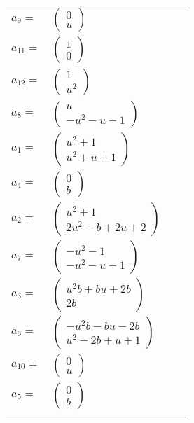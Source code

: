 \documentclass[1p]{elsarticle_modified}
\theoremstyle{definition}
\begin{document}
\begin{tabular}{m{7pt} m{180pt} m{7pt} m{180pt} }
\flushright $a_{9}=$&$\begin{pmatrix}0\\u\end{pmatrix}$ \\
\flushright $a_{11}=$&$\begin{pmatrix}1\\0\end{pmatrix}$ \\
\flushright $a_{12}=$&$\begin{pmatrix}1\\u^2\end{pmatrix}$ \\
\flushright $a_{8}=$&$\begin{pmatrix}u\\- u^2- u-1\end{pmatrix}$ \\
\flushright $a_{1}=$&$\begin{pmatrix}u^2+1\\u^2+u+1\end{pmatrix}$ \\
\flushright $a_{4}=$&$\begin{pmatrix}0\\b\end{pmatrix}$ \\
\flushright $a_{2}=$&$\begin{pmatrix}u^2+1\\2 u^2- b+2 u+2\end{pmatrix}$ \\
\flushright $a_{7}=$&$\begin{pmatrix}- u^2-1\\- u^2- u-1\end{pmatrix}$ \\
\flushright $a_{3}=$&$\begin{pmatrix}u^2 b+b u+2 b\\2 b\end{pmatrix}$ \\
\flushright $a_{6}=$&$\begin{pmatrix}- u^2 b- b u-2 b\\u^2-2 b+u+1\end{pmatrix}$ \\
\flushright $a_{10}=$&$\begin{pmatrix}0\\u\end{pmatrix}$ \\
\flushright $a_{5}=$&$\begin{pmatrix}0\\b\end{pmatrix}$\\&\end{tabular}
\end{document}
